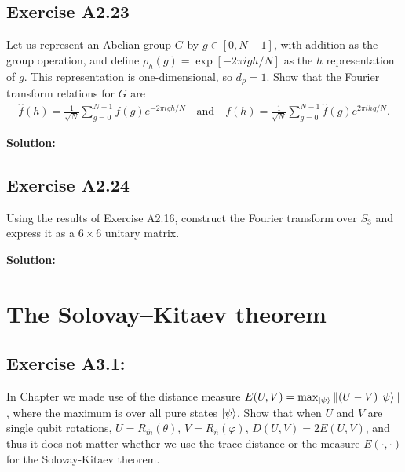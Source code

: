 \documentclass{book}
\begin{document}
\section*{Exercise A2.23}
    Let us represent an Abelian group $G$ by $g\in [0,N-1]$, with addition as the group operation, and define $\rho_h(g) = \exp[-2\pi i gh/N]$ as the $h$ representation of $g$. This representation is one-dimensional, so $d_\rho = 1$. Show that the Fourier transform relations for $G$ are 
    \begin{align}
        \hat{f}(h)= \frac{1}{\sqrt{N}} \sum_{g=0}^{N-1} f(g) e^{-2\pi i g h/N} \quad \text{and} \quad f(h)= \frac{1}{\sqrt{N}} \sum_{g=0}^{N-1} \hat{f}(g) e^{2\pi i h g/N}.
    \end{align}
    
    \textbf{Solution:}
    
\section*{Exercise A2.24}
    Using the results of Exercise A2.16, construct the Fourier transform over $S_3$ and express it as a $6\times6$ unitary matrix.
    
    \textbf{Solution:}


\chapter{The Solovay–Kitaev theorem}

\section*{Exercise A3.1:} 
    In Chapter we made use of the distance measure $E(U,V)=\max_{\ket{\psi}}\norm{(U-V)\ket{\psi}}$, where the maximum is over all pure states $\ket{\psi}$. Show that when $U$ and $V$ are single qubit rotations, $U = R_{\hat{m}}(\theta)$, $V = R_{\hat{n}}(\varphi)$, $D(U,V) = 2 E(U,V)$, and thus it does not matter whether we use the trace distance or the measure $E(\cdot, \cdot)$ for the Solovay-Kitaev theorem.
    
\end{document}
